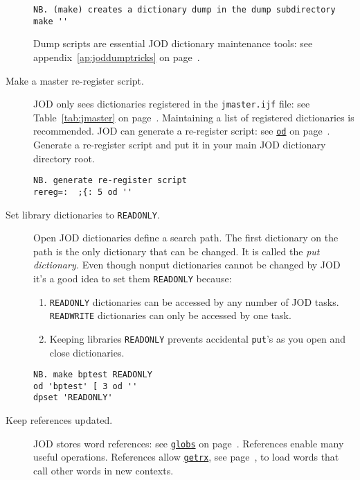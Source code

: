 \begin{description}
\begin{lstlisting}[frame=single,framerule=0pt]
NB. (make) creates a dictionary dump in the dump subdirectory
make ''
\end{lstlisting}

Dump scripts are essential JOD dictionary maintenance tools: see appendix~\ref{ap:joddumptricks} on page~\pageref{ap:joddumptricks}.
 
\item[Make a master re-register script.]   JOD only sees dictionaries registered in the \verb|jmaster.ijf| file:
see Table~\ref{tab:jmaster} on page~\pageref{tab:jmaster}.
Maintaining a list of registered dictionaries is recommended.  JOD can generate a re-register script: see \hyperlink{il:od}{\texttt{od}} on page~\pageref{ss:od}.  Generate a re-register script and put it in your main JOD dictionary directory root.

\begin{lstlisting}[frame=single,framerule=0pt]
NB. generate re-register script
rereg=:  ;{: 5 od ''
\end{lstlisting}
 

\item[Set library dictionaries to \texttt{READONLY}.]  Open JOD dictionaries define a search path.  The first dictionary on the path is the only dictionary that can be changed.  
It is called the \emph{put dictionary.}  Even though nonput 
dictionaries cannot be changed by JOD it's a good idea to set them \texttt{READONLY} because:
\begin{enumerate}
\item \texttt{READONLY} dictionaries can be accessed by any number of JOD tasks. \texttt{READWRITE} dictionaries can only be accessed by one task.  
\item Keeping libraries \texttt{READONLY} prevents accidental \texttt{put}'s as you open and close dictionaries.
\end{enumerate}

\begin{lstlisting}[frame=single,framerule=0pt]
NB. make bptest READONLY
od 'bptest' [ 3 od ''
dpset 'READONLY'
\end{lstlisting}
 
 
\item[Keep references updated.]  JOD stores word references: see \hyperlink{il:globs}{\texttt{globs}} on page~\pageref{ss:globs}.  References enable many useful operations. References allow \hyperlink{il:getrx}{\texttt{getrx}}, see page~\pageref{ss:getrx}, to load words that call other words in new contexts.


\end{description}
